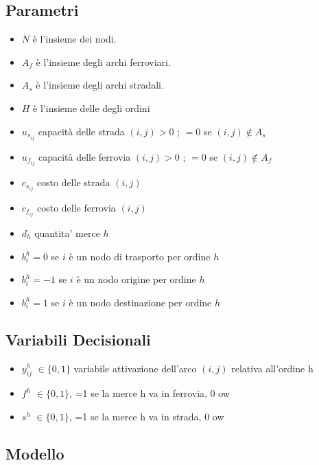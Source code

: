 \documentclass{article}
\begin{document}
\subsection{Parametri}
\begin{itemize}
    \item \textbf{$N$} è l'insieme dei nodi.
    \item \textbf{$A_f$} è l'insieme degli archi ferroviari.
    \item \textbf{$A_s$} è l'insieme degli archi stradali.
    \item \textbf{$H$} è l'insieme delle degli ordini
    \item $u_{s_{ij}}$ capacità delle strada $(i,j) > 0$ ; $=0$ se $(i,j) \not\in A_s $ 
    \item $u_{f_{ij}}$ capacità delle ferrovia $(i,j) > 0$ ; $=0$ se $(i,j) \not\in A_f $ 
    \item $c_{s_{ij}}$ costo delle strada $(i,j)$
    \item $c_{f_{ij}}$ costo delle ferrovia $(i,j)$
    \item $d_h$ quantita' merce $h$
\end{itemize}

\begin{itemize}
    \item $b_i^h = 0$ se $i$ è un nodo di trasporto per ordine $h$
    \item  $b_i^h =-1$ se $i$ è un nodo origine per ordine $h$
    \item $b_i^h =1$ se $i$ è un nodo destinazione per ordine $h$
\end{itemize}

\subsection{Variabili Decisionali}
\begin{itemize}
    \item $y_{ij}^h$ $\in \{0,1\}$ variabile attivazione dell'arco $(i,j)$ relativa all'ordine h
    \item $f^h$ $\in \{0,1\}$, =1 se la merce h va in ferrovia, 0 ow
    \item $s^h$ $\in \{0,1\}$, =1 se la merce h va in strada, 0 ow
\end{itemize}

\subsection{Modello}
\end{document}
